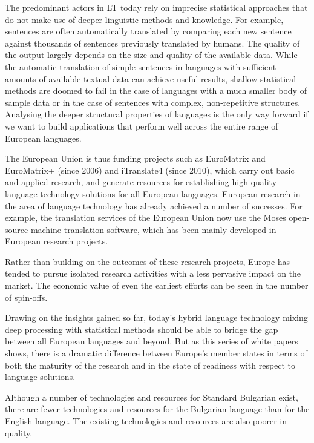 \documentclass[]{../../metanetpaper}
\begin{document}
\begin{multicols}{2}
The predominant actors in LT today rely on imprecise statistical approaches that do not make use of deeper linguistic methods and knowledge. For example, sentences are often automatically translated by comparing each new sentence against thousands of sentences previously translated by humans. The quality of the output largely depends on the size and quality of the available  data. While the automatic translation of simple sentences in languages with sufficient amounts of available textual data can achieve useful results, shallow statistical methods are doomed to fail in the case of languages with a much smaller body of sample data or in the case of sentences with complex, non-repetitive structures. Analysing the deeper structural properties of languages is the only way forward if we want to build applications that perform well across the entire range of European languages.


The European Union is thus funding projects such as EuroMatrix and EuroMatrix+ (since 2006) and iTranslate4 (since 2010), which carry out basic and applied research, and generate resources for establishing high quality language technology solutions for all European languages. 
European research in the area of language technology has already achieved a number of successes. For example, the translation services of the European Union now use the Moses open-source machine translation software, which has been mainly developed in European research projects. 

Rather than building on the outcomes of these research projects, Europe has tended to pursue isolated research activities with a less pervasive impact on the market. The economic value of even the earliest efforts can be seen in the number of spin-offs. 


Drawing on the insights gained so far, today’s hybrid language technology mixing deep processing with statistical methods should be able to bridge the gap between all European languages and beyond. But as this series of white papers shows, there is a dramatic difference between Europe’s
member states in terms of both the maturity of the research and in the state of readiness with respect to language solutions.
 
Although a number of technologies and resources for Standard Bulgarian exist, there are fewer technologies and resources for the Bulgarian language than for the English language. The existing technologies and resources are also poorer in quality.


\end{multicols}
\end{document}
